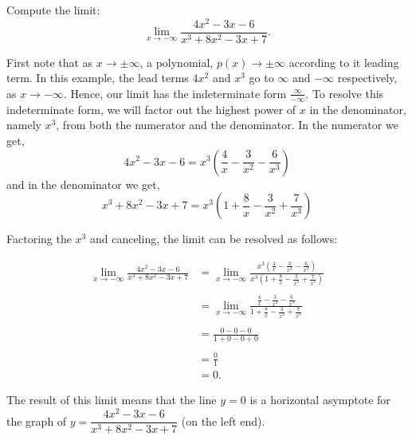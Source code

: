 \documentclass[handout]{ximera}
\begin{document}
\begin{example}[example 3]
Compute the limit:
\[
\lim_{x \to -\infty} \frac{4x^2 - 3x - 6}{x^3 +8x^2 -3x + 7}.
\]


First note that as $x\to \pm \infty$, a polynomial, $p(x) \to \pm \infty$ according to it leading term.
In this example, the lead terms $4x^2$ and $x^3$  go to $\infty$ and $-\infty$ respectively, as $x \to -\infty$. 
Hence, our limit has the indeterminate form
$\frac{\infty}{-\infty}$.
To resolve this indeterminate form, we will factor out 
the highest power of $x$ in the denominator, namely $x^3$, from both the numerator and the denominator.  
In the numerator we get, 
\[4x^2 - 3x - 6 = x^3\left(\frac{4}{x} - \frac{3}{x^2} - \frac{6}{x^3}\right)\]
and in the denominator we get,
\[x^3 +8x^2 -3x + 7 = x^3\left(1 +  \frac{8}{x} - \frac{3}{x^2} + \frac{7}{x^3}\right)\]

Factoring the $x^3$ and canceling, the limit can be resolved as follows:

\begin{align*}
\lim_{x \to -\infty}\frac{4x^2 - 3x - 6}{x^3 +8x^2 -3x + 7} &= 
\lim_{x \to -\infty} \frac{x^3\left(\frac{4}{x}-\frac{3}{x^2} -\frac{6}{x^3}\right)}
{x^3\left(1 + \frac{8}{x}-\frac{3}{x^2}+\frac{7}{x^3}\right)} \\ \\
&=\lim_{x \to -\infty} \frac{\frac{4}{x}-\frac{3}{x^2} -\frac{6}{x^3}}{1 + \frac{8}{x}-\frac{3}{x^2}+\frac{7}{x^3}} \\ \\
&=\frac{0 - 0 - 0}{1 +0- 0 + 0} \\ \\
&= \frac01 \\
&= 0.
\end{align*}

The result of this limit means that the line $y = 0$  is a horizontal asymptote
for the graph of $y = \dfrac{4x^2 - 3x - 6}{x^3 +8x^2 -3x + 7}$ (on the left end).
\end{example}
\end{document}

